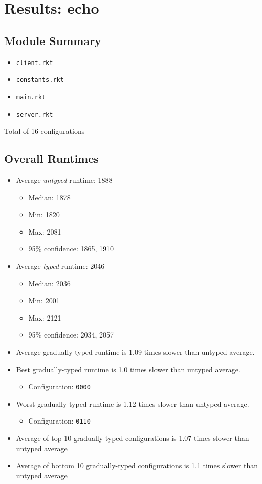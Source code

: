 \documentclass{article}
\newcommand{\mono}[1]{\texttt{#1}}
\begin{document}
\section{Results: echo}

\subsection{Module Summary}
\begin{itemize}
\item \mono{client.rkt}
\item \mono{constants.rkt}
\item \mono{main.rkt}
\item \mono{server.rkt}\end{itemize}
Total of 16 configurations

\subsection{Overall Runtimes}
\begin{itemize}
\item Average \emph{untyped} runtime: 1888
  \begin{itemize}
  \item Median: 1878
  \item Min: 1820
  \item Max: 2081
  \item 95\% confidence: 1865, 1910
  \end{itemize}
\item Average \emph{typed} runtime: 2046
  \begin{itemize}
  \item Median: 2036
  \item Min: 2001
  \item Max: 2121
  \item 95\% confidence: 2034, 2057
  \end{itemize}
\item Average gradually-typed runtime is 1.09 times slower than untyped average.
\item Best gradually-typed runtime is 1.0 times slower than untyped average.
\begin{itemize}\item Configuration: \mono{0000}\end{itemize}
\item Worst gradually-typed runtime is 1.12 times slower than untyped average.
\begin{itemize}\item Configuration: \mono{0110}\end{itemize}
\item Average of top 10 gradually-typed configurations is 1.07 times slower than untyped average
\item Average of bottom 10 gradually-typed configurations is 1.1 times slower than untyped average
\end{itemize}
\end{document}
